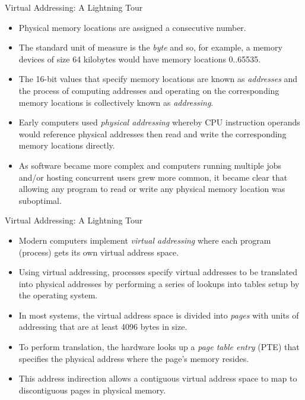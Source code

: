 \documentclass{beamer}
\begin{document}
\begin{frame}{Virtual Addressing: A Lightning Tour}
\begin{itemize}
    \item<1->Physical memory locations are assigned a consecutive number.
    \item<1->The standard unit of measure is the \emph{byte} and so, for example, a memory devices of size 64 kilobytes would have memory locations 0..65535.
    \item<1->The 16-bit values that specify memory locations are known as \emph{addresses} and the process of computing addresses and operating on the corresponding memory locations is collectively known as \emph{addressing}.
    \item<1->Early computers used \emph{physical addressing} whereby CPU instruction operands would reference physical addresses then read and write the corresponding memory locations directly.
    \item<1->As software became more complex and computers running multiple jobs and/or hosting concurrent users grew more common, it became clear that allowing any program to read or write any physical memory location was suboptimal.
\end{itemize}
\end{frame}

\begin{frame}{Virtual Addressing: A Lightning Tour}
\begin{itemize}
\itemsep1em
    \item<1->Modern computers implement \emph{virtual addressing} where each program (process) gets its own virtual address space.
    \item<1->Using virtual addressing, processes specify virtual addresses to be translated into physical addresses by performing a series of lookups into tables setup by the operating system.
    \item<1->In most systems, the virtual address space is divided into \emph{pages} with units of addressing that are at least 4096 bytes in size.
    \item<1->To perform translation, the hardware looks up a \emph{page table entry} (PTE) that specifies the physical address where the page's memory resides.
    \item<1->This address indirection allows a contiguous virtual address space to map to discontiguous pages in physical memory.
\end{itemize}
\end{frame}
\end{document}
